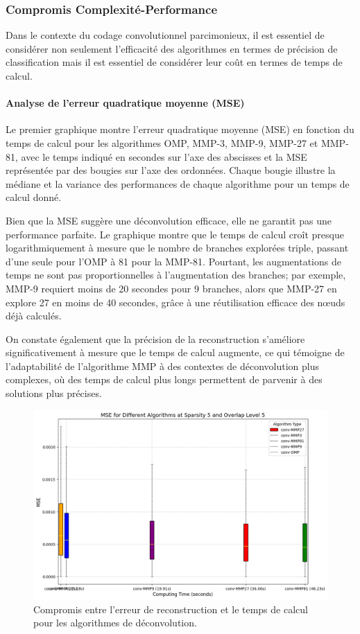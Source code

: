 \documentclass[9pt,a4paper,twoside]{rho}
\begin{document}
\subsubsection{Compromis Complexité-Performance}

Dans le contexte du codage convolutionnel parcimonieux, il est essentiel de considérer non seulement l'efficacité des algorithmes en termes de précision de classification mais il est essentiel de considérer leur coût en termes de temps de calcul. 

\paragraph{Analyse de l'erreur quadratique moyenne (MSE)}

Le premier graphique montre l'erreur quadratique moyenne (MSE) en fonction du temps de calcul pour les algorithmes OMP, MMP-3, MMP-9, MMP-27 et MMP-81, avec le temps indiqué en secondes sur l'axe des abscisses et la MSE représentée par des bougies sur l'axe des ordonnées. Chaque bougie illustre la médiane et la variance des performances de chaque algorithme pour un temps de calcul donné.

Bien que la MSE suggère une déconvolution efficace, elle ne garantit pas une performance parfaite. Le graphique montre que le temps de calcul croît presque logarithmiquement à mesure que le nombre de branches explorées triple, passant d'une seule pour l'OMP à 81 pour la MMP-81. Pourtant, les augmentations de temps ne sont pas proportionnelles à l'augmentation des branches; par exemple, MMP-9 requiert moins de 20 secondes pour 9 branches, alors que MMP-27 en explore 27 en moins de 40 secondes, grâce à une réutilisation efficace des nœuds déjà calculés.

On constate également que la précision de la reconstruction s'améliore significativement à mesure que le temps de calcul augmente, ce qui témoigne de l'adaptabilité de l'algorithme MMP à des contextes de déconvolution plus complexes, où des temps de calcul plus longs permettent de parvenir à des solutions plus précises.

\begin{figure}[H]
    \centering
    \includegraphics[width=1\linewidth]{images/trade_off_mse.png}
    \caption{Compromis entre l'erreur de reconstruction et le temps de calcul pour les algorithmes de déconvolution.}
    \label{fig:trade_off_mse}
\end{figure}
\end{document}
